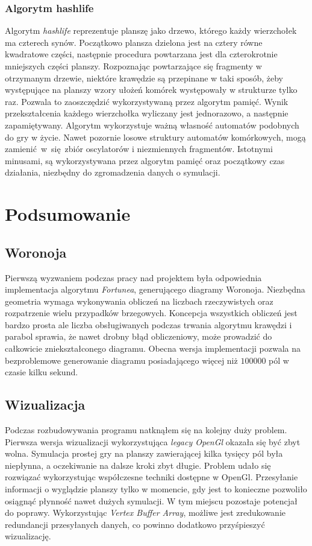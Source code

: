 \documentclass[declaration,shortabstract, inz]{iithesis}
\theoremstyle{definition} \newtheorem{definition}{Definicja}[]
\theoremstyle{plain} \newtheorem{remark}[definition]{Obserwacja}
\theoremstyle{plain} \newtheorem{theorem}[definition]{Twierdzenie}
\theoremstyle{plain} \newtheorem{example}{Przykład}[definition]
\theoremstyle{plain} \newtheorem{lemma}[definition]{Lemat}
\begin{document}
\subsection{Algorytm hashlife}
Algorytm \textit{hashlife} reprezentuje planszę jako drzewo, którego każdy wierzchołek ma czterech synów. Początkowo plansza dzielona jest na cztery równe kwadratowe części, następnie procedura powtarzana jest dla czterokrotnie mniejszych części planszy. Rozpoznając powtarzające się fragmenty w otrzymanym drzewie, niektóre krawędzie są przepinane w taki sposób, żeby występujące na planszy wzory ułożeń komórek występowały w strukturze tylko raz. Pozwala to zaoszczędzić wykorzystywaną przez algorytm pamięć. Wynik przekształcenia każdego wierzchołka wyliczany jest jednorazowo, a następnie zapamiętywany. Algorytm wykorzystuje ważną własność automatów podobnych do gry w życie. Nawet pozornie losowe struktury automatów komórkowych, mogą zamienić~w~się~zbiór oscylatorów i niezmiennych fragmentów. Istotnymi minusami, są wykorzystywana przez algorytm pamięć oraz początkowy czas działania, niezbędny do zgromadzenia danych o symulacji.

\chapter{Podsumowanie}

\section{Woronoja}
Pierwszą wyzwaniem podczas pracy nad projektem była odpowiednia implementacja algorytmu \textit{Fortunea}, generującego diagramy Woronoja. Niezbędna geometria wymaga wykonywania obliczeń na liczbach rzeczywistych oraz rozpatrzenie wielu przypadków brzegowych. Koncepcja wszystkich obliczeń jest bardzo prosta ale liczba obsługiwanych podczas trwania algorytmu krawędzi i parabol sprawia, że nawet drobny błąd obliczeniowy, może prowadzić do całkowicie zniekształconego diagramu. Obecna wersja implementacji pozwala na bezproblemowe generowanie diagramu posiadającego więcej niż $100000$ pól w czasie kilku sekund. 

\section{Wizualizacja}
Podczas rozbudowywania programu natknąłem się na kolejny duży problem. Pierwsza wersja wizualizacji wykorzystująca \textit{legacy OpenGl} okazała się być zbyt wolna. Symulacja prostej gry na planszy zawierającej kilka tysięcy pól była niepłynna, a oczekiwanie na dalsze kroki zbyt długie. Problem udało się rozwiązać wykorzystując współczesne techniki dostępne w OpenGl. Przesyłanie informacji o wyglądzie planszy tylko w momencie, gdy jest to konieczne pozwoliło osiągnąć płynność nawet dużych symulacji. W tym miejscu pozostaje potencjał do poprawy. Wykorzystując \textit{Vertex Buffer Array}, możliwe jest zredukowanie redundancji przesyłanych danych, co powinno dodatkowo przyśpieszyć wizualizację.
\end{document}
